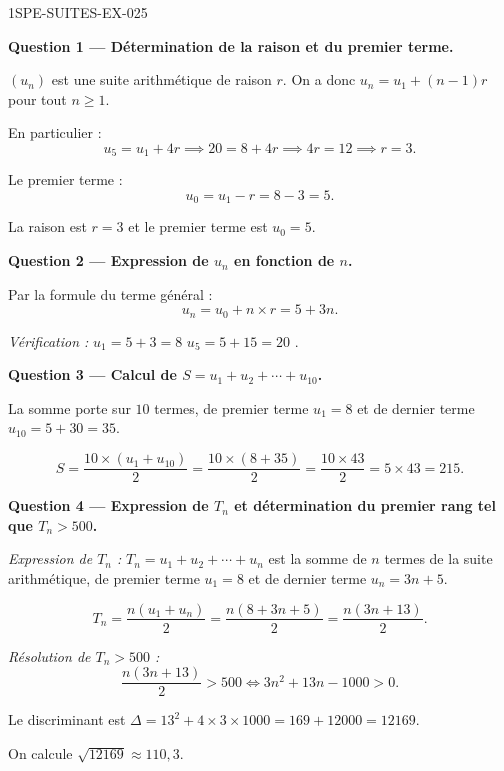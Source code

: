 \begin{corrige}{1SPE-SUITES-EX-025}

\textbf{Question 1 — Détermination de la raison et du premier terme.}

$(u_n)$ est une suite arithmétique de raison $r$. On a donc $u_n = u_1 + (n-1)r$ pour tout $n \geq 1$.

En particulier :
\[
  u_5 = u_1 + 4r \implies 20 = 8 + 4r \implies 4r = 12 \implies r = 3.
\]


Le premier terme :
\[
  u_0 = u_1 - r = 8 - 3 = 5.
\]

La raison est $r = 3$ et le premier terme est $u_0 = 5$.

\medskip
\textbf{Question 2 — Expression de $u_n$ en fonction de $n$.}

Par la formule du terme général :
\[
  u_n = u_0 + n \times r = 5 + 3n.
\]

\textit{Vérification :} $u_1 = 5 + 3 = 8$ \checkmark \quad $u_5 = 5 + 15 = 20$ \checkmark.

\medskip
\textbf{Question 3 — Calcul de $S = u_1 + u_2 + \cdots + u_{10}$.}

La somme porte sur $10$ termes, de premier terme $u_1 = 8$ et de dernier terme $u_{10} = 5 + 30 = 35$.


\[
  S = \frac{10 \times (u_1 + u_{10})}{2} = \frac{10 \times (8 + 35)}{2} = \frac{10 \times 43}{2} = 5 \times 43 = 215.
\]

\medskip
\textbf{Question 4 — Expression de $T_n$ et détermination du premier rang tel que $T_n > 500$.}

\textit{Expression de $T_n$ :} $T_n = u_1 + u_2 + \cdots + u_n$ est la somme de $n$ termes de la suite arithmétique, de premier terme $u_1 = 8$ et de dernier terme $u_n = 3n + 5$.

\[
  T_n = \frac{n(u_1 + u_n)}{2} = \frac{n(8 + 3n + 5)}{2} = \frac{n(3n + 13)}{2}.
\]

\textit{Résolution de $T_n > 500$ :}
\[
  \frac{n(3n + 13)}{2} > 500 \iff 3n^2 + 13n - 1000 > 0.
\]

Le discriminant est $\Delta = 13^2 + 4 \times 3 \times 1000 = 169 + 12000 = 12169$.

On calcule $\sqrt{12169} \approx 110{,}3$.



\end{corrige}
